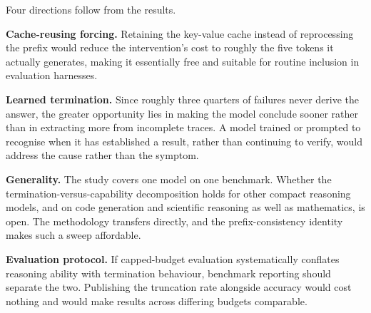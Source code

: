 \documentclass[12pt,a4paper,oneside]{report}
\begin{document}
Four directions follow from the results.

\textbf{Cache-reusing forcing.} Retaining the key-value cache instead of
reprocessing the prefix would reduce the intervention's cost to roughly the five
tokens it actually generates, making it essentially free and suitable for
routine inclusion in evaluation harnesses.

\textbf{Learned termination.} Since roughly three quarters of failures never
derive the answer, the greater opportunity lies in making the model conclude
sooner rather than in extracting more from incomplete traces. A model trained or
prompted to recognise when it has established a result, rather than continuing
to verify, would address the cause rather than the symptom.

\textbf{Generality.} The study covers one model on one benchmark. Whether the
termination-versus-capability decomposition holds for other compact reasoning
models, and on code generation and scientific reasoning as well as mathematics,
is open. The methodology transfers directly, and the prefix-consistency identity
makes such a sweep affordable.

\textbf{Evaluation protocol.} If capped-budget evaluation systematically
conflates reasoning ability with termination behaviour, benchmark reporting
should separate the two. Publishing the truncation rate alongside accuracy would
cost nothing and would make results across differing budgets comparable.
\end{document}
